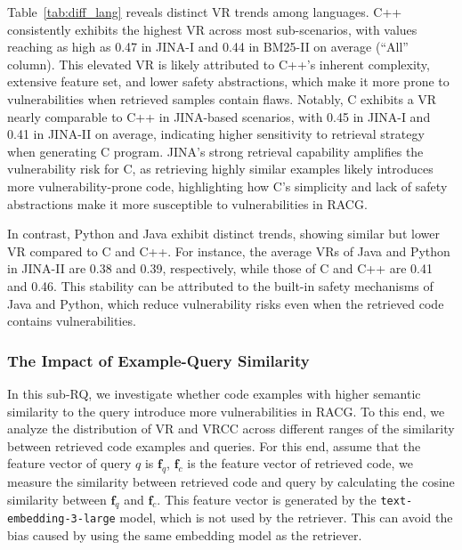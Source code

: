 Table~\ref{tab:diff_lang} reveals distinct VR trends among languages. C++ consistently exhibits the highest VR across most sub-scenarios, with values reaching as high as 0.47 in JINA-I and 0.44 in BM25-II on average (\ie ``All'' column). This elevated VR is likely attributed to C++'s inherent complexity, extensive feature set, and lower safety abstractions, which make it more prone to vulnerabilities when retrieved samples contain flaws. Notably, C exhibits a VR nearly comparable to C++ in JINA-based scenarios, with 0.45 in JINA-I and 0.41 in JINA-II on average, indicating higher sensitivity to retrieval strategy when generating C program. JINA's strong retrieval capability amplifies the vulnerability risk for C, as retrieving highly similar examples likely introduces more vulnerability-prone code, highlighting how C’s simplicity and lack of safety abstractions make it more susceptible to vulnerabilities in RACG.

In contrast, Python and Java exhibit distinct trends, showing similar but lower VR compared to C and C++. For instance, the average VRs of Java and Python in JINA-II are 0.38 and 0.39, respectively, while those of C and C++ are 0.41 and 0.46. This stability can be attributed to the built-in safety mechanisms of Java and Python, which reduce vulnerability risks even when the retrieved code contains vulnerabilities.



\subsubsection{The Impact of Example-Query Similarity}
\label{subsec:similarity}
In this sub-RQ, we investigate whether code examples with higher semantic similarity to the query introduce more vulnerabilities in RACG. To this end, we analyze the distribution of VR and VRCC across different ranges of the similarity between retrieved code examples and queries. For this end, assume that the feature vector of query $q$ is $\mathbf{f}_{q}$, $\mathbf{f}_{c}$ is the feature vector of retrieved code, we measure the similarity between retrieved code and query by calculating the cosine similarity between $\mathbf{f}_{q}$ and $\mathbf{f}_{c}$. This feature vector is generated by the {\tt text-embedding-3-large} model, which is not used by the retriever. This can avoid the bias caused by using the same embedding model as the retriever. 

